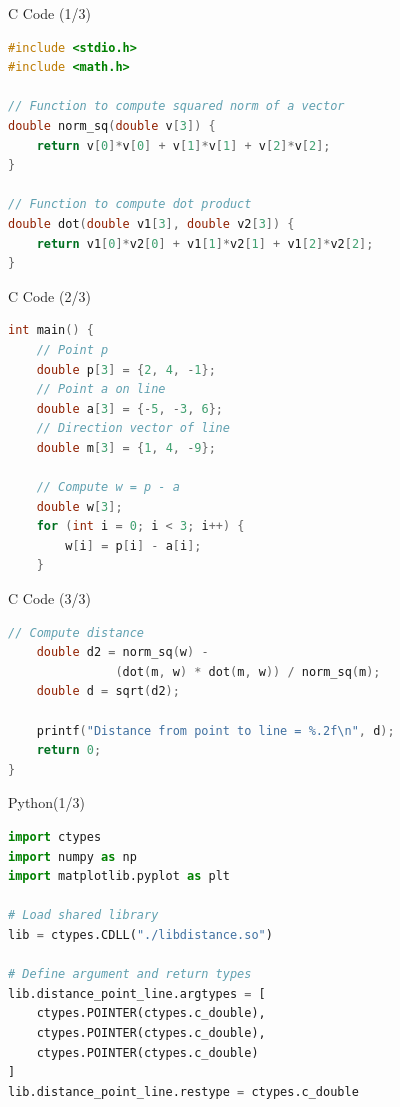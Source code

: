 \documentclass{beamer}
\begin{document}
\begin{frame}[fragile]{C Code (1/3)}
\begin{lstlisting}[language=C]
#include <stdio.h>
#include <math.h>

// Function to compute squared norm of a vector
double norm_sq(double v[3]) {
    return v[0]*v[0] + v[1]*v[1] + v[2]*v[2];
}

// Function to compute dot product
double dot(double v1[3], double v2[3]) {
    return v1[0]*v2[0] + v1[1]*v2[1] + v1[2]*v2[2];
}
\end{lstlisting}
\end{frame}

\begin{frame}[fragile]{C Code (2/3)}
\begin{lstlisting}[language=C]
int main() {
    // Point p
    double p[3] = {2, 4, -1};
    // Point a on line
    double a[3] = {-5, -3, 6};
    // Direction vector of line
    double m[3] = {1, 4, -9};
    
    // Compute w = p - a
    double w[3];
    for (int i = 0; i < 3; i++) {
        w[i] = p[i] - a[i];
    }
\end{lstlisting}
\end{frame}

\begin{frame}[fragile]{C Code (3/3)}
\begin{lstlisting}[language=C]
    // Compute distance
    double d2 = norm_sq(w) - 
               (dot(m, w) * dot(m, w)) / norm_sq(m);
    double d = sqrt(d2);

    printf("Distance from point to line = %.2f\n", d);
    return 0;
}
\end{lstlisting}
\end{frame}

\begin{frame}[fragile]{Python(1/3)}
\begin{lstlisting}[language=Python]
import ctypes
import numpy as np
import matplotlib.pyplot as plt

# Load shared library
lib = ctypes.CDLL("./libdistance.so")

# Define argument and return types
lib.distance_point_line.argtypes = [
    ctypes.POINTER(ctypes.c_double),
    ctypes.POINTER(ctypes.c_double),
    ctypes.POINTER(ctypes.c_double)
]
lib.distance_point_line.restype = ctypes.c_double
\end{lstlisting}
\end{frame}
\end{document}
